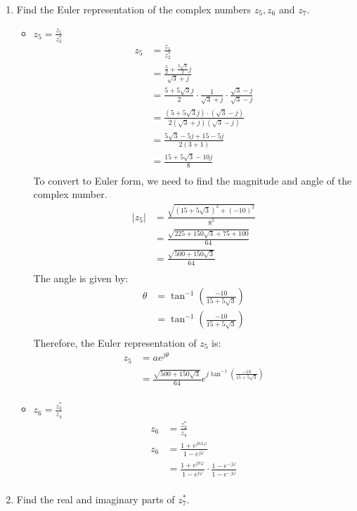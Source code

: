 \documentclass{article}
\begin{document}
\begin{enumerate}
    \item Find the Euler representation of the complex numbers $z_5, z_6$ and $z_7$.

    \begin{itemize}
        \item $z_5 = \frac{z_1}{z^*_2}$
        \begin{align*}
            z_5 &= \frac{z_1}{z^*_2} \\
            &= \frac{\frac{5}{2} + \frac{5\sqrt{3}}{2}j}{\sqrt{3}+j} \\
            &= \frac{5+5\sqrt{3}j}{2} \cdot \frac{1}{\sqrt{3}+j} \cdot \frac{\sqrt{3}-j}{\sqrt{3}-j} \\
            &= \frac{(5+5\sqrt{3}j)\cdot(\sqrt{3}-j)}{2(\sqrt{3}+j)(\sqrt{3}-j)} \\
            &= \frac{5\sqrt{3} - 5j + 15 - 5j}{2(3+1)} \\
            &= \frac{15 + 5\sqrt{3} - 10j}{8} \\
        \end{align*}
        To convert to Euler form, we need to find the magnitude and angle of the complex number.
        \begin{align*}
            |z_5| &= \frac{\sqrt{(15+5\sqrt{3})^2 + (-10)^2}}{8^2} \\
            &= \frac{\sqrt{225 + 150\sqrt{3} + 75 + 100}}{64} \\
            &= \frac{\sqrt{500 + 150\sqrt{3}}}{64} \\
        \end{align*}
        The angle is given by:
        \begin{align*}
            \theta &= \tan^{-1}\left(\frac{-10}{15+5\sqrt{3}}\right) \\
            &= \tan^{-1}\left(\frac{-10}{15+5\sqrt{3}}\right) \\
        \end{align*}
        Therefore, the Euler representation of $z_5$ is:
        \begin{align*}
            z_5 &= a e^{j\theta} \\
            &= \frac{\sqrt{500 + 150\sqrt{3}}}{64} e^{j\tan^{-1}\left(\frac{-10}{15+5\sqrt{3}}\right)} \\
        \end{align*}

        \item $z_6 = \frac{z^*_3}{z_4}$
        \begin{align*}
            z_6 &= \frac{z^*_3}{z_4} \\
            z_6 &= \frac{1+e^{jn1\varphi}}{1-e^{j\varphi}} \\
            &= \frac{1+e^{j\pi\varphi}}{1-e^{j\varphi}} \cdot \frac{1-e^{-j\varphi}}{1-e^{-j\varphi}} \\
        \end{align*}
    \end{itemize}

    \item Find the real and imaginary parts of $z^*_7$.
\end{enumerate}
\end{document}
